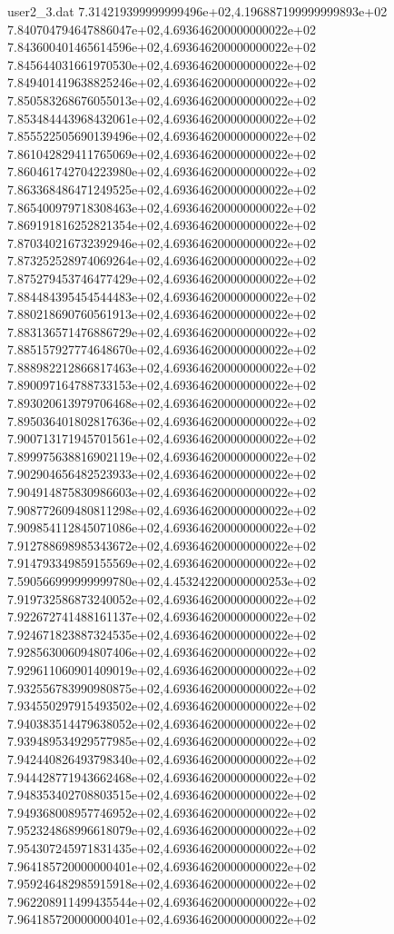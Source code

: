 \begin{filecontents}{user2_3.dat}
7.314219399999999496e+02,4.196887199999999893e+02
7.840704794647886047e+02,4.693646200000000022e+02
7.843600401465614596e+02,4.693646200000000022e+02
7.845644031661970530e+02,4.693646200000000022e+02
7.849401419638825246e+02,4.693646200000000022e+02
7.850583268676055013e+02,4.693646200000000022e+02
7.853484443968432061e+02,4.693646200000000022e+02
7.855522505690139496e+02,4.693646200000000022e+02
7.861042829411765069e+02,4.693646200000000022e+02
7.860461742704223980e+02,4.693646200000000022e+02
7.863368486471249525e+02,4.693646200000000022e+02
7.865400979718308463e+02,4.693646200000000022e+02
7.869191816252821354e+02,4.693646200000000022e+02
7.870340216732392946e+02,4.693646200000000022e+02
7.873252528974069264e+02,4.693646200000000022e+02
7.875279453746477429e+02,4.693646200000000022e+02
7.884484395454544483e+02,4.693646200000000022e+02
7.880218690760561913e+02,4.693646200000000022e+02
7.883136571476886729e+02,4.693646200000000022e+02
7.885157927774648670e+02,4.693646200000000022e+02
7.888982212866817463e+02,4.693646200000000022e+02
7.890097164788733153e+02,4.693646200000000022e+02
7.893020613979706468e+02,4.693646200000000022e+02
7.895036401802817636e+02,4.693646200000000022e+02
7.900713171945701561e+02,4.693646200000000022e+02
7.899975638816902119e+02,4.693646200000000022e+02
7.902904656482523933e+02,4.693646200000000022e+02
7.904914875830986603e+02,4.693646200000000022e+02
7.908772609480811298e+02,4.693646200000000022e+02
7.909854112845071086e+02,4.693646200000000022e+02
7.912788698985343672e+02,4.693646200000000022e+02
7.914793349859155569e+02,4.693646200000000022e+02
7.590566999999999780e+02,4.453242200000000253e+02
7.919732586873240052e+02,4.693646200000000022e+02
7.922672741488161137e+02,4.693646200000000022e+02
7.924671823887324535e+02,4.693646200000000022e+02
7.928563006094807406e+02,4.693646200000000022e+02
7.929611060901409019e+02,4.693646200000000022e+02
7.932556783990980875e+02,4.693646200000000022e+02
7.934550297915493502e+02,4.693646200000000022e+02
7.940383514479638052e+02,4.693646200000000022e+02
7.939489534929577985e+02,4.693646200000000022e+02
7.942440826493798340e+02,4.693646200000000022e+02
7.944428771943662468e+02,4.693646200000000022e+02
7.948353402708803515e+02,4.693646200000000022e+02
7.949368008957746952e+02,4.693646200000000022e+02
7.952324868996618079e+02,4.693646200000000022e+02
7.954307245971831435e+02,4.693646200000000022e+02
7.964185720000000401e+02,4.693646200000000022e+02
7.959246482985915918e+02,4.693646200000000022e+02
7.962208911499435544e+02,4.693646200000000022e+02
7.964185720000000401e+02,4.693646200000000022e+02

\end{filecontents}
